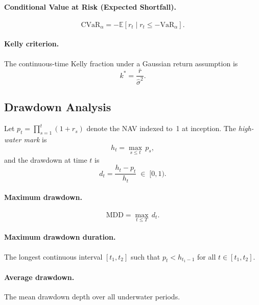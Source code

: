 \documentclass[11pt,a4paper]{article}
\newcommand{\E}{\mathbb{E}}
\begin{document}
\paragraph{Conditional Value at Risk (Expected Shortfall).}
\begin{equation}
  \mathrm{CVaR}_\alpha = -\E[r_t \mid r_t \leq -\mathrm{VaR}_\alpha].
\end{equation}

\paragraph{Kelly criterion.}
The continuous-time Kelly fraction under a Gaussian return assumption is
\begin{equation}
  k^* = \frac{\bar{r}}{\hat\sigma^2}.
\end{equation}

\subsection{Drawdown Analysis}

Let $p_t = \prod_{s=1}^{t}(1 + r_s)$ denote the NAV indexed to~1 at inception.
The \emph{high-water mark} is
\begin{equation}
  h_t = \max_{s \leq t}\, p_s,
\end{equation}
and the drawdown at time $t$ is
\begin{equation}
  d_t = \frac{h_t - p_t}{h_t} \;\in\; [0, 1).
\end{equation}

\paragraph{Maximum drawdown.}
\begin{equation}
  \mathrm{MDD} = \max_{t \leq T}\, d_t.
\end{equation}

\paragraph{Maximum drawdown duration.}
The longest continuous interval $[t_1, t_2]$ such that $p_t < h_{t_1-1}$ for
all $t \in [t_1, t_2]$.

\paragraph{Average drawdown.}
The mean drawdown depth over all underwater periods.
\end{document}
